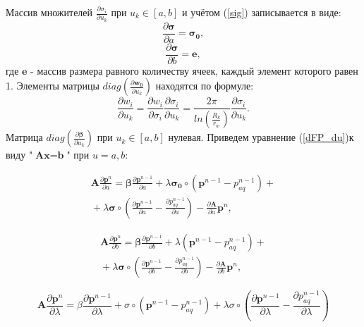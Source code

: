 \documentclass[14pt]{article}
\begin{document}
Массив множителей $ \frac{\partial \sigma_i}{\partial u_k} $ при $ u_k \in [a,b]$ и учётом (\ref{sig}) записывается в виде:
\begin{equation*} \label{dsig_da}
\frac{\partial \boldsymbol{\sigma}}{\partial a} = \boldsymbol{\sigma_0},
\end{equation*}
\begin{equation*} \label{dsig_db}
\frac{\partial \boldsymbol{\sigma}}{\partial b} = \boldsymbol{e},
\end{equation*}
где $ \boldsymbol{e} $ - массив размера равного количеству ячеек, каждый элемент которого равен 1.
Элементы матрицы $ diag(\frac{\partial \boldsymbol{w_0}}{\partial u_k}) $ находятся по формуле:
\begin{equation} \label{dWI}
\frac{\partial w_i}{\partial u_k} = \frac{\partial w_i}{\partial \sigma_i}\frac{\partial \sigma_i}{\partial u_k} =  \frac{2 \pi}{ln\left(\frac{R_k}{r_w}\right)}\frac{\partial \sigma_i}{\partial u_k}.
\end{equation} 
Матрица $ diag(\frac{\partial \boldsymbol{\beta}}{\partial u_k}) $ при $ u_k \in [a,b]$ нулевая. Приведем уравнение (\ref{dFP_du})к виду "$\textbf{A}\textbf{x}=\textbf{b}$" при $u = a,b$:

\begin{eqnarray} \label{eq_dp_da}
\boldsymbol{A}\frac{\partial \boldsymbol{p}^n}{\partial a} = \boldsymbol{\beta}\frac{\partial\boldsymbol{p}^{n-1}}{\partial a}
+ \lambda\boldsymbol{\sigma_0} \circ \left(\boldsymbol{p}^{n-1}-p_{aq}^{n-1}\right) +  {} \nonumber\\
{} +\lambda\boldsymbol{\sigma} \circ \left(\frac{\partial \boldsymbol{p}^{n-1}}{\partial a}-\frac{\partial p_{aq}^{n-1}}{\partial a}\right)
-\frac{\partial \boldsymbol{A}}{\partial a}\boldsymbol{p}^n,
\end{eqnarray}

\begin{eqnarray} \label{eq_dp_db}
\boldsymbol{A}\frac{\partial \boldsymbol{p}^n}{\partial b} = \boldsymbol{\beta}\frac{\partial\boldsymbol{p}^{n-1}}{\partial b} + \lambda(\boldsymbol{p}^{n-1}-p_{aq}^{n-1}) +  {} \nonumber\\
{} + \lambda\boldsymbol{\sigma} \circ \left(\frac{\partial \boldsymbol{p}^{n-1}}{\partial b}-\frac{\partial p_{aq}^{n-1}}{\partial b}\right)
-\frac{\partial\boldsymbol{A}}{\partial b}\boldsymbol{p}^n,
\end{eqnarray}

\begin{equation} \label{eq_dp_dlam}
\boldsymbol{A}\frac{\partial \boldsymbol{p}^n}{\partial \lambda}
 = \beta\frac{\partial \boldsymbol{p}^{n-1}}{\partial \lambda} + \sigma \circ \left(\boldsymbol{p}^{n-1}-p_{aq}^{n-1}\right)
 +\lambda\sigma \circ \left(\frac{\partial \boldsymbol{p}^{n-1}}{\partial \lambda}
 -\frac{\partial p_{aq}^{n-1}}{\partial \lambda}\right)
\end{equation}
\end{document}

